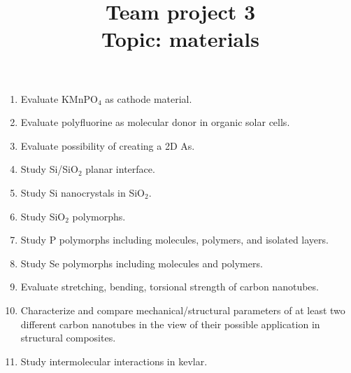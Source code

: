 \documentclass{Project}
\begin{document}
\title{Team project 3 \\ Topic: materials}
\maketitle

\preface{}

\begin{enumerate}
\item Evaluate KMnPO$_4$ as cathode material.
\item Evaluate polyfluorine as molecular donor in organic solar cells.
\item Evaluate possibility of creating a 2D As.
\item Study Si/SiO$_2$ planar interface.
\item Study Si nanocrystals in SiO$_2$.
\item Study SiO$_2$ polymorphs.
\item Study P polymorphs including molecules, polymers, and isolated layers.
\item Study Se polymorphs including molecules and polymers.
\item Evaluate stretching, bending, torsional strength of carbon nanotubes.
\item Characterize and compare mechanical/structural parameters of at least
two different carbon nanotubes in the view of their possible application in structural composites.
\item Study intermolecular interactions in kevlar.
\end{enumerate}

\reminder{}
\end{document}
